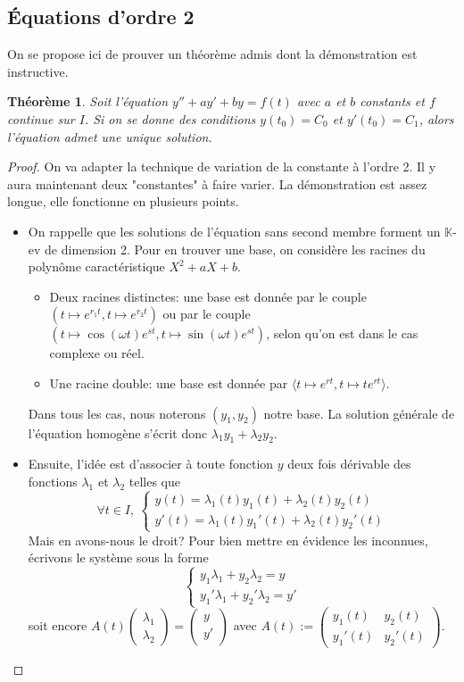 \documentclass[french]{book}
\newcommand{\K}{\mathbb{K}}
\theoremstyle{plain}
\newtheorem{thm}{Théorème}[chapter]
\theoremstyle{definition}
\theoremstyle{remark}
\begin{document}
\subsection{Équations d'ordre 2}
On se propose ici de prouver un théorème admis dont la démonstration est instructive.
\begin{thm}
	Soit l'équation $y''+ay'+by=f(t)$ avec $a$ et $b$ constants et $f$ continue sur $I$.
Si on se donne des conditions $y(t_0)=C_0$ et $y'(t_0)=C_1$, alors l'équation admet une unique solution.
\end{thm}
\begin{proof}
On va adapter la technique de variation de la constante à l'ordre 2. Il y aura maintenant deux "constantes" à faire varier. La démonstration est assez longue, elle fonctionne en plusieurs points.
\begin{itemize}
	\item On rappelle que les solutions de l'équation sans second membre forment un $\K$-ev de dimension 2. Pour en trouver une base, on considère les racines du polynôme caractéristique $X^2+aX+b$.
	\begin{itemize}
		\item[--] Deux racines distinctes: une base est donnée par le couple $(t\mapsto e^{r_1t},t\mapsto e^{r_2t})$ ou par le couple $(t\mapsto \cos(\omega t)e^{st},t\mapsto \sin(\omega t)e^{st})$, selon qu'on est dans le cas complexe ou réel.
		\item[--] Une racine double: une base est donnée par $\langle t\mapsto e^{rt},t\mapsto te^{rt}\rangle$.
	\end{itemize}
	Dans tous les cas, nous noterons $(y_1,y_2)$ notre base. La solution générale de l'équation homogène s'écrit donc $\lambda_1y_1+\lambda_2y_2$.
	\item Ensuite, l'idée est d'associer à toute fonction $y$ deux fois dérivable des fonctions $\lambda_1$ et $\lambda_2$ telles que $$\forall t\in I,\ \begin{cases}y(t)=\lambda_1(t)y_1(t)+\lambda_2(t)y_2(t)\\ y'(t)=\lambda_1(t)y_1'(t)+\lambda_2(t)y_2'(t)\end{cases}$$
	Mais en avons-nous le droit? Pour bien mettre en évidence les inconnues, écrivons le
	système sous la forme $$\begin{cases}y_1\lambda_1+y_2\lambda_2=y\\ y_1'\lambda_1+y_2'\lambda_2=y'\end{cases}$$
	soit encore $\displaystyle A(t)\begin{pmatrix}\lambda_1\\ \lambda_2\end{pmatrix}=\begin{pmatrix}y\\ y'\end{pmatrix}$ avec $\displaystyle A(t):=\begin{pmatrix}y_1(t)&y_2(t)\\ y_1'(t)&y_2'(t)\end{pmatrix}$. \\

\end{itemize}
\end{proof}
\end{document}

